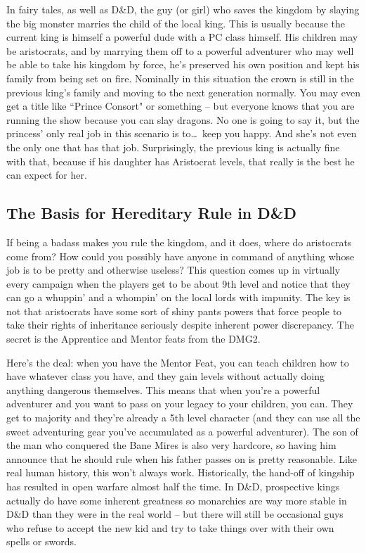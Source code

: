 In fairy tales, as well as D\&D, the guy (or girl) who saves the kingdom by slaying the big monster marries the child of the local king. This is usually because the current king is himself a powerful dude with a PC class himself. His children may be aristocrats, and by marrying them off to a powerful adventurer who may well be able to take his kingdom by force, he's preserved his own position and kept his family from being set on fire. Nominally in this situation the crown is still in the previous king's family and moving to the next generation normally. You may even get a title like ``Prince Consort" or something -- but everyone knows that you are running the show because you can slay dragons. No one is going to say it, but the princess' only real job in this scenario is to\ldots\  keep you happy. And she's not even the only one that has that job. Surprisingly, the previous king is actually fine with that, because if his daughter has Aristocrat levels, that really is the best he can expect for her.

\subsection{The Basis for Hereditary Rule in D\&D}
\vspace*{-8pt}

If being a badass makes you rule the kingdom, and it does, where do aristocrats come from? How could you possibly have anyone in command of anything whose job is to be pretty and otherwise useless? This question comes up in virtually every campaign when the players get to be about 9th level and notice that they can go a whuppin' and a whompin' on the local lords with impunity. The key is not that aristocrats have some sort of shiny pants powers that force people to take their rights of inheritance seriously despite inherent power discrepancy. The secret is the Apprentice and Mentor feats from the DMG2.

Here's the deal: when you have the Mentor Feat, you can teach children how to have whatever class you have, and they gain levels without actually doing anything dangerous themselves. This means that when you're a powerful adventurer and you want to pass on your legacy to your children, you can. They get to majority and they're already a 5th level character (and they can use all the sweet adventuring gear you've accumulated as a powerful adventurer). The son of the man who conquered the Bane Mires is also very hardcore, so having him announce that he should rule when his father passes on is pretty reasonable. Like real human history, this won't always work. Historically, the hand-off of kingship has resulted in open warfare almost half the time. In D\&D, prospective kings actually do have some inherent greatness so monarchies are way more stable in D\&D than they were in the real world -- but there will still be occasional guys who refuse to accept the new kid and try to take things over with their own spells or swords.


